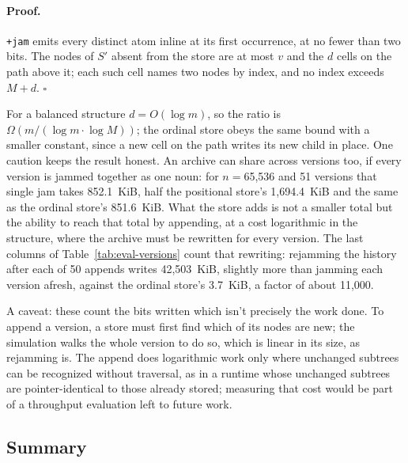 \documentclass[twoside]{article}
\begin{document}
\paragraph*{Proof.}
\texttt{+jam} emits every distinct atom inline at its first occurrence, at no fewer than two bits.  The nodes of $S'$ absent from the store are at most $v$ and the $d$ cells on the path above it; each such cell names two nodes by index, and no index exceeds $M + d$. \hfill$\square$

\bigskip
\noindent\sloppy
For a balanced structure $d = O(\log m)$, so the ratio is $\Omega(m / (\log m \cdot \log M))$; the ordinal store obeys the same bound with a smaller constant, since a new cell on the path writes its new child in place.  One caution keeps the result honest.  An archive can share across versions too, if every version is jammed together as one noun:  for $n={}$65,536 and 51 versions that single jam takes 852.1~KiB, half the positional store's 1,694.4~KiB and the same as the ordinal store's 851.6~KiB.  What the store adds is not a smaller total but the ability to reach that total by appending, at a cost logarithmic in the structure, where the archive must be rewritten for every version.  The last columns of Table~\ref{tab:eval-versions} count that rewriting:  rejamming the history after each of 50 appends writes 42,503~KiB, slightly more than jamming each version afresh, against the ordinal store's 3.7~KiB, a factor of about 11,000.

A caveat:  these count the bits written which isn't precisely the work done.  To append a version, a store must first find which of its nodes are new; the simulation walks the whole version to do so, which is linear in its size, as rejamming is.  The append does logarithmic work only where unchanged subtrees can be recognized without traversal, as in a runtime whose unchanged subtrees are pointer-identical to those already stored; measuring that cost would be part of a throughput evaluation left to future work.

\subsection{Summary}
\end{document}
